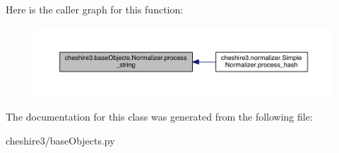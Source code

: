 Here is the caller graph for this function\-:
\nopagebreak
\begin{figure}[H]
\begin{center}
\leavevmode
\includegraphics[width=350pt]{classcheshire3_1_1base_objects_1_1_normalizer_a5ebeb17a40ed6d4258d6fd362441de50_icgraph}
\end{center}
\end{figure}




The documentation for this class was generated from the following file\-:\begin{DoxyCompactItemize}
\item 
cheshire3/base\-Objects.\-py\end{DoxyCompactItemize}
